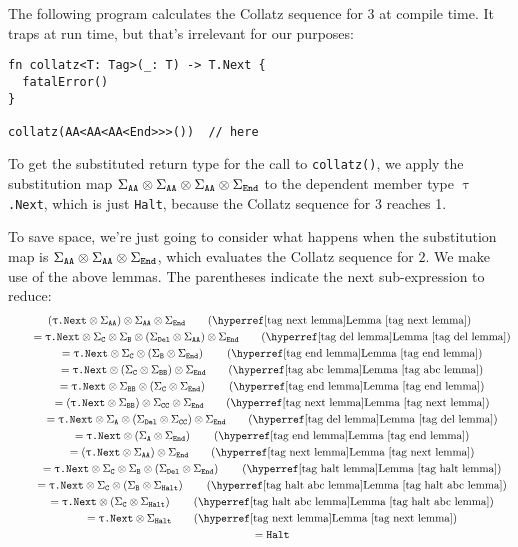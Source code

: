 \documentclass[../generics]{subfiles}
\begin{document}
\begin{example}
The following program calculates the Collatz sequence for $3$ at compile time. It traps at run time, but that's irrelevant for our purposes:
\begin{Verbatim}
fn collatz<T: Tag>(_: T) -> T.Next {
  fatalError()
}

collatz(AA<AA<AA<End>>>())  // here
\end{Verbatim}
To get the substituted return type for the call to \texttt{collatz()}, we apply the substitution map $\Sigma_{\texttt{AA}}\otimes\Sigma_{\texttt{AA}}\otimes\Sigma_{\texttt{AA}}\otimes\Sigma_{\texttt{End}}$ to the dependent member type \texttt{$\uptau$.Next}, which is just \texttt{Halt}, because the Collatz sequence for 3 reaches 1.

To save space, we're just going to consider what happens when the substitution map is $\Sigma_{\texttt{AA}} \otimes \Sigma_{\texttt{AA}} \otimes \Sigma_{\texttt{End}}$, which evaluates the Collatz sequence for $2$. We make use of the above lemmas. The parentheses indicate the next sub-expression to reduce:
\begin{gather*}
\left(\TNext\otimes\SigmaAA\right)\otimes\SigmaAA\otimes\SigmaEnd \tag{\LemmaRef{tag next lemma}}\\
\qquad {} = \TNext \otimes \SigmaC \otimes \SigmaB \otimes \left(\SigmaDel \otimes \SigmaAA\right)\otimes\SigmaEnd \tag{\LemmaRef{tag del lemma}}\\
\qquad {} = \TNext \otimes \SigmaC \otimes \left(\SigmaB \otimes\SigmaEnd\right) \tag{\LemmaRef{tag end lemma}}\\
\qquad {} = \TNext \otimes \left(\SigmaC \otimes \SigmaBB\right) \otimes\SigmaEnd \tag{\LemmaRef{tag abc lemma}}\\
\qquad {} = \TNext \otimes \SigmaBB \otimes \left(\SigmaC \otimes\SigmaEnd\right) \tag{\LemmaRef{tag end lemma}}\\
\qquad {} = \left(\TNext\otimes\SigmaBB\right)\otimes\SigmaCC\otimes\SigmaEnd \tag{\LemmaRef{tag next lemma}}\\
\qquad {} = \TNext\otimes\SigmaA \otimes \left(\SigmaDel \otimes \SigmaCC\right)\otimes\SigmaEnd  \tag{\LemmaRef{tag del lemma}}\\
\qquad {} = \TNext\otimes\left(\SigmaA \otimes \SigmaEnd\right) \tag{\LemmaRef{tag end lemma}}\\
\qquad {} = \left(\TNext\otimes\SigmaAA\right) \otimes \SigmaEnd \tag{\LemmaRef{tag next lemma}}\\
\qquad {} = \TNext \otimes \SigmaC \otimes \SigmaB \otimes \left( \SigmaDel \otimes \SigmaEnd\right) \tag{\LemmaRef{tag halt lemma}}\\
\qquad {} = \TNext \otimes \SigmaC \otimes \left(\SigmaB \otimes \SigmaHalt\right) \tag{\LemmaRef{tag halt abc lemma}}\\
\qquad {} = \TNext \otimes \left(\SigmaC \otimes \SigmaHalt\right) \tag{\LemmaRef{tag halt abc lemma}}\\
\qquad {} = \TNext \otimes \SigmaHalt \tag{\LemmaRef{tag next lemma}}\\
\qquad {} = \Halt
\end{gather*}
\end{example}
\end{document}

